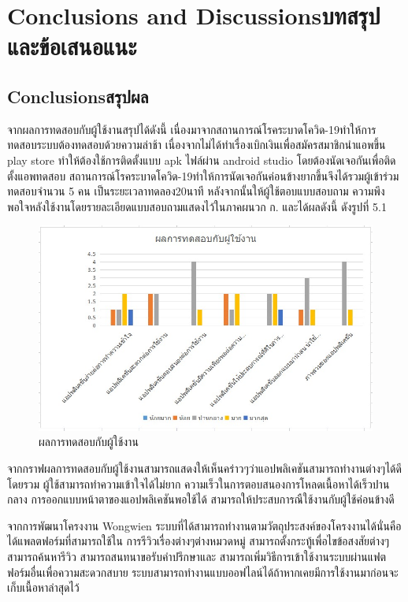 \chapter{\ifenglish Conclusions and Discussions\else บทสรุปและข้อเสนอแนะ\fi}

\section{\ifenglish Conclusions\else สรุปผล\fi}

\quad \quad จากผลการทดสอบกับผู้ใช้งานสรุปได้ดังนี้
เนื่องมาจากสถานการณ์โรคระบาดโควิด-19ทำให้การทดสอบระบบต้องทดสอบด้วยความล่าช้า
เนื่องจากไม่ได้ทำเรื่องเบิกเงินเพื่อสมัครสมาชิกนำแอพขึ้น play store ทำให้ต้องใช้การติดตั้งแบบ apk ไฟล์ผ่าน android studio
โดยต้องนัดเจอกันเพื่อติดตั้งแอพทดสอบ สถานการณ์โรคระบาดโควิด-19ทำให้การนัดเจอกันค่อนข้างยากขึ้นจึงได้รวมผู้เข้าร่วมทดสอบจำนวน 5 คน เป็นระยะเวลาทดลอง20นาที หลังจากนั้นให้ผู้ใช้ตอบแบบสอบถาม
ความพึงพอใจหลังใช้งานโดยรายละเอียดแบบสอบถามแสดงไว้ในภาคผนวก ก. และได้ผลดังนี้ ดังรูปที่
5.1


\begin{figure}
    \begin{center}
      \includegraphics[width=1\textwidth]{./image/form/result_reviews.jpg}
    \end{center}
    \caption[ผลการทดสอบกับผู้ใช้งาน]{ผลการทดสอบกับผู้ใช้งาน}
    \end{figure}

    จากกราฟผลการทดสอบกับผู้ใช้งานสามารถแสดงให้เห็นคร่าวๆว่าแอปพลิเคชันสามารถทำงานต่างๆได้ดีโดยรวม 
    ผู้ใช้สามารถทำความเข้าใจได้ไม่ยาก ความเร็วในการตอบสนองการโหลดเนื้อหาได้เร็วปานกลาง การออกแบบหน้าตาของแอปพลิเคชันพอใช้ได้
    สามารถให้ประสบการณืใช้งานกับผู้ใช้ค่อนข้างดี 

    จากการพัฒนาโครงงาน Wongwien ระบบที่ได้สามารถทำงานตามวัตถุประสงค์ของโครงงานได้นั่นคือได้แพลตฟอร์มที่สามารถใช้ใน
    การรีวิวเรื่องต่างๆต่างหมวดหมู่ สามารถตั้งกระทู้เพื่อไขข้อสงสัยต่างๆ สามารถค้นหารีวิว สามารถสนทนาขอรับคำปรึกษาและ
    สามารถเพิ่มวิธีการเข้าใช้งานระบบผ่านแฟตฟอร์มอื่นเพื่อความสะดวกสบาย ระบบสามารถทำงานแบบออฟไลน์ได้ถ้าหากเคยมีการใช้งานมาก่อนจะเก็บเนื้อหาล่าสุดไว้

